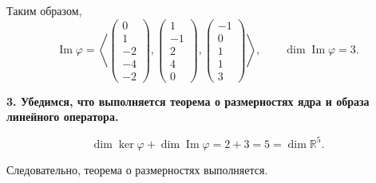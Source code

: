 Таким образом,
\[
\operatorname{Im}\varphi=
\left\langle
\begin{pmatrix}
0\\
1\\
-2\\
-4\\
-2
\end{pmatrix},
\begin{pmatrix}
1\\
-1\\
2\\
4\\
0
\end{pmatrix},
\begin{pmatrix}
-1\\
0\\
1\\
1\\
3
\end{pmatrix}
\right\rangle,
\qquad
\dim\operatorname{Im}\varphi=3.
\]

\bigskip

\textbf{3. Убедимся, что выполняется теорема о размерностях ядра и образа линейного оператора.}

\[
\dim\ker\varphi+\dim\operatorname{Im}\varphi=2+3=5=\dim\mathbb{R}^5.
\]

Следовательно, теорема о размерностях выполняется.
